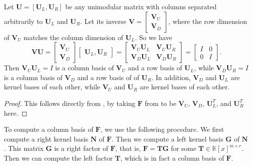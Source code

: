 \begin{cor}
\label{cor:unimodular_kernel_columnBasis2}Let $\mathbf{U}=\left[\mathbf{U}_{L},\mathbf{U}_{R}\right]$
be any unimodular matrix with columns separated arbitrarily to $\mathbf{U}_{L}$
and $\mathbf{U}_{R}$. Let its inverse $\mathbf{V}=\begin{bmatrix}\mathbf{V}_{U}\\
\mathbf{V}_{D}
\end{bmatrix}$, where the row dimension of $\mathbf{V}_{U}$ matches the column
dimension of $\mathbf{U}_{L}$. So we have 
\[
\mathbf{V}\mathbf{U}=\begin{bmatrix}\mathbf{V}_{U}\\
\mathbf{V}_{D}
\end{bmatrix}\begin{bmatrix}\mathbf{U}_{L},\mathbf{U}_{R}\end{bmatrix}=\begin{bmatrix}\mathbf{V}_{U}\mathbf{U}_{L} & \mathbf{V}_{U}\mathbf{U}_{R}\\
\mathbf{V}_{D}\mathbf{U}_{L} & \mathbf{V}_{D}\mathbf{U}_{R}
\end{bmatrix}=\begin{bmatrix}I & 0\\
0 & I
\end{bmatrix}.
\]
Then $\mathbf{V}_{U}\mathbf{U}_{L}=I$ is a column basis of $\mathbf{V}_{U}$
and a row basis of $\mathbf{U}_{L}$, while $\mathbf{V}_{D}\mathbf{U}_{R}=I$
is a column basis of $\mathbf{V}_{D}$ and a row basis of of $\mathbf{U}_{R}$.
In addition, \textup{$\mathbf{V}_{D}$ and $\mathbf{U}_{L}$ are kernel
bases of each other, while $\mathbf{V}_{U}$ and $\mathbf{U}_{R}$
are kernel bases of each other.}\end{cor}
\begin{proof}
This follows directly from ,
by taking $\mathbf{F}$ from 
to be $\mathbf{V}_{U}$, $\mathbf{V}_{D}$, $\mathbf{U}_{L}^{T}$,
and $\mathbf{U}_{R}^{T}$ here.
\end{proof}
To compute a column basis of $\mathbf{F}$, we use the following procedure.
We first compute a right  kernel basis $\mathbf{N}$ of $\mathbf{F}$.
Then we compute a left  kernel basis $\mathbf{G}$ of $\mathbf{N}$.
This matrix $\mathbf{G}$ is a right factor of $\mathbf{F}$, that
is, $\mathbf{F}=\mathbf{T}\mathbf{G}$ for some $\mathbf{T}\in\mathbb{K}\left[x\right]^{m\times r}$.
Then we can compute the left factor $\mathbf{T}$, which is in fact
a column basis of $\mathbf{F}$.
